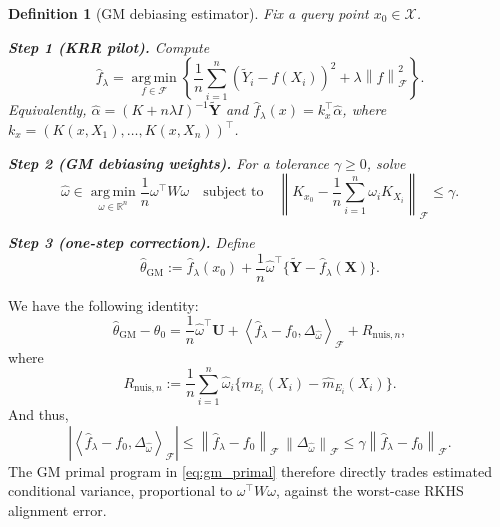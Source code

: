 \documentclass[11pt]{article}
\newtheorem{definition}{Definition}[section]
\newcommand{\R}{\mathbb{R}}
\newcommand{\F}{\mathcal{F}}
\newcommand{\X}{\mathcal{X}}
\newcommand{\argmin}{\operatorname*{arg\,min}}
\newcommand{\inner}[2]{\left\langle #1,#2\right\rangle}
\newcommand{\norm}[1]{\left\lVert #1\right\rVert}
\newcommand{\abs}[1]{\left\lvert #1\right\rvert}
\begin{document}
\begin{definition}[GM debiasing estimator]\label{def:gm_estimator}
Fix a query point $x_0\in\X$.

\medskip
\noindent\textbf{Step 1 (KRR pilot).} Compute
\begin{equation}
  \widehat f_{\lambda}
  =\argmin_{f\in\F}
  \left\{
    \frac1n\sum_{i=1}^n(\widetilde Y_i-f(X_i))^2+\lambda\norm{f}_{\F}^2
  \right\}.
  \label{eq:krr_pilot}
\end{equation}
Equivalently, $\widehat\alpha=(K+n\lambda I)^{-1}\widetilde{\bm Y}$ and $\widehat f_\lambda(x)=k_x^\top\widehat\alpha$, where $k_x=(K(x,X_1),\ldots,K(x,X_n))^\top$.

\medskip
\noindent\textbf{Step 2 (GM debiasing weights).} For a tolerance $\gamma\ge0$, solve
\begin{equation}
  \widehat\omega
  \in\argmin_{\omega\in\R^n}\frac1n\omega^\top W\omega
  \quad\text{subject to}\quad
  \norm{K_{x_0}-\frac1n\sum_{i=1}^n\omega_iK_{X_i}}_{\F}\le\gamma.
  \label{eq:gm_primal}
\end{equation}

\medskip
\noindent\textbf{Step 3 (one-step correction).} Define
\begin{equation}
  \widehat\theta_{\mathrm{GM}}
  :=\widehat f_\lambda(x_0)
  +\frac1n\widehat\omega^\top\{\widetilde{\bm Y}-\widehat f_\lambda(\bm X)\}.
  \label{eq:gm_estimator}
\end{equation}
\end{definition}

We have the following identity:
\begin{equation}
  \widehat\theta_{\mathrm{GM}}-\theta_0
  =\frac1n\widehat\omega^\top\bm U
  +\inner{\widehat f_\lambda-f_0}{\Delta_{\widehat\omega}}_{\F}
  +R_{\mathrm{nuis},n},
  \label{eq:gm_decomposition}
\end{equation}
where
\[
 R_{\mathrm{nuis},n}:=\frac1n\sum_{i=1}^n\widehat\omega_i
 \{m_{E_i}(X_i)-\widehat m_{E_i}(X_i)\}.
\]
And thus,
\[
  \abs{\inner{\widehat f_\lambda-f_0}{\Delta_{\widehat\omega}}_{\F}}
  \le\norm{\widehat f_\lambda-f_0}_{\F}\,\norm{\Delta_{\widehat\omega}}_{\F}
  \le \gamma\norm{\widehat f_\lambda-f_0}_{\F}.
\]
The GM primal program in \eqref{eq:gm_primal} therefore directly trades estimated conditional variance, proportional to $\omega^\top W\omega$, against the worst-case RKHS alignment error.
\end{document}
